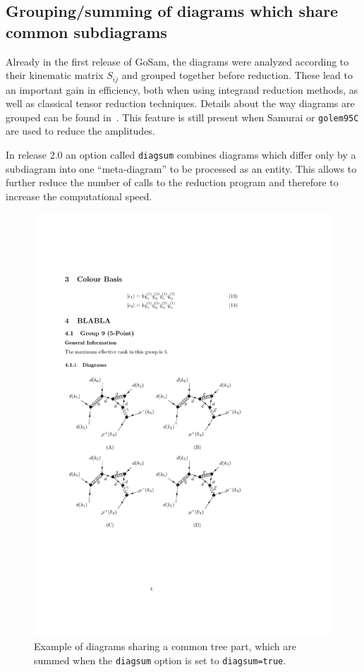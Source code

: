 \documentclass[11pt,a4paper]{refrep}
\newcommand{\gosam}{{\sc GoSam}\xspace}
\newcommand{\golemVC}{{\tt golem95C}\xspace}
\newcommand{\samurai}{{\sc Samurai}\xspace}
\begin{document}
\subsection{Grouping/summing of diagrams which share common subdiagrams}
\label{sec:grouping_summing}
Already in the first release of \gosam{}, the diagrams were analyzed
according to their kinematic matrix $S_{ij}$ and grouped together
before reduction. These lead to an important gain in efficiency, both
when using integrand reduction methods, as well as 
classical tensor reduction techniques. Details about the way diagrams
are grouped can be found in~\cite{Cullen:2011ac}. This feature is
still present when \samurai{} or \golemVC{} are used to reduce the
amplitudes.

In release 2.0 an option called {\tt diagsum} combines diagrams
which differ only by a subdiagram into one ``meta-diagram'' to be
processed as an entity. This allows to further reduce the number of
calls to the reduction program and therefore to increase the
computational speed. 

\begin{figure}[htb]
\centering
\includegraphics[width=1.0\textwidth]{diagsum1.pdf}
\caption{Example of diagrams sharing a common tree part, which are 
summed when the {\tt diagsum} option is set to {\tt diagsum=true}.}
\label{fig:diagsum_tree}
\end{figure} 
\end{document}
